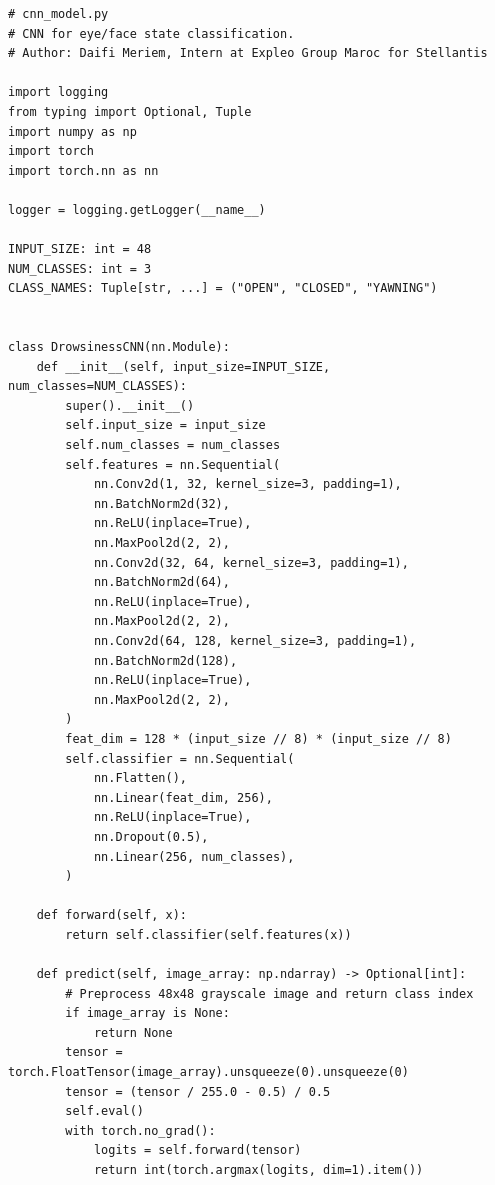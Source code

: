 \documentclass[12pt,a4paper]{report}
\begin{document}
\begin{lstlisting}[style=python, caption={cnn\_model.py -- code complet},
  label=lst:cnn_full]
# cnn_model.py
# CNN for eye/face state classification.
# Author: Daifi Meriem, Intern at Expleo Group Maroc for Stellantis

import logging
from typing import Optional, Tuple
import numpy as np
import torch
import torch.nn as nn

logger = logging.getLogger(__name__)

INPUT_SIZE: int = 48
NUM_CLASSES: int = 3
CLASS_NAMES: Tuple[str, ...] = ("OPEN", "CLOSED", "YAWNING")


class DrowsinessCNN(nn.Module):
    def __init__(self, input_size=INPUT_SIZE, num_classes=NUM_CLASSES):
        super().__init__()
        self.input_size = input_size
        self.num_classes = num_classes
        self.features = nn.Sequential(
            nn.Conv2d(1, 32, kernel_size=3, padding=1),
            nn.BatchNorm2d(32),
            nn.ReLU(inplace=True),
            nn.MaxPool2d(2, 2),
            nn.Conv2d(32, 64, kernel_size=3, padding=1),
            nn.BatchNorm2d(64),
            nn.ReLU(inplace=True),
            nn.MaxPool2d(2, 2),
            nn.Conv2d(64, 128, kernel_size=3, padding=1),
            nn.BatchNorm2d(128),
            nn.ReLU(inplace=True),
            nn.MaxPool2d(2, 2),
        )
        feat_dim = 128 * (input_size // 8) * (input_size // 8)
        self.classifier = nn.Sequential(
            nn.Flatten(),
            nn.Linear(feat_dim, 256),
            nn.ReLU(inplace=True),
            nn.Dropout(0.5),
            nn.Linear(256, num_classes),
        )

    def forward(self, x):
        return self.classifier(self.features(x))

    def predict(self, image_array: np.ndarray) -> Optional[int]:
        # Preprocess 48x48 grayscale image and return class index
        if image_array is None:
            return None
        tensor = torch.FloatTensor(image_array).unsqueeze(0).unsqueeze(0)
        tensor = (tensor / 255.0 - 0.5) / 0.5
        self.eval()
        with torch.no_grad():
            logits = self.forward(tensor)
            return int(torch.argmax(logits, dim=1).item())
\end{lstlisting}

\clearpage

\end{document}
